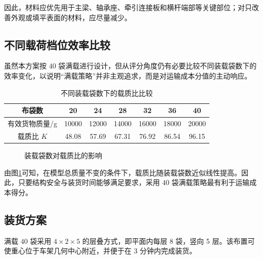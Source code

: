 \documentclass[UTF8,a4paper,12pt,fontset=none]{ctexart}
\numberwithin{equation}{section}
\numberwithin{figure}{section}
\numberwithin{table}{section}
\begin{document}
因此，材料应优先用于主梁、轴承座、牵引连接板和横杆端部等关键部位；对只改善外观或填平表面的材料，应尽量减少。

\subsection{不同载荷档位效率比较}
虽然本方案按 $40$ 袋满载进行设计，但从评分角度仍有必要比较不同装载袋数下的效率变化，以说明“满载策略”并非主观追求，而是对运输成本分值的主动响应。

\begin{table}[H]
\centering
\caption{不同装载袋数下的载质比比较}
\label{tab:bag-efficiency}
\begin{tabular}{c c c c c c c}
\toprule
布袋数 & 20 & 24 & 28 & 32 & 36 & 40 \\
\midrule
有效货物质量/g & 10000 & 12000 & 14000 & 16000 & 18000 & 20000 \\
载质比 $K$ & 48.08 & 57.69 & 67.31 & 76.92 & 86.54 & 96.15 \\
\bottomrule
\end{tabular}
\end{table}

\begin{figure}[H]
\centering
{}
\caption{装载袋数对载质比的影响}
\label{fig:bag-efficiency}
\end{figure}

由图\ref{fig:bag-efficiency}可知，在模型总质量不变的条件下，载质比随装载袋数近似线性提高。因此，只要结构安全与装货时间能够满足要求，采用 $40$ 袋满载策略最有利于运输成本得分。

\subsection{装货方案}
满载 $40$ 袋采用 $4\times2\times5$ 的层叠方式，即平面内每层 8 袋，竖向 5 层。该布置可使重心位于车架几何中心附近，并便于在 3 分钟内完成装货。
\end{document}
